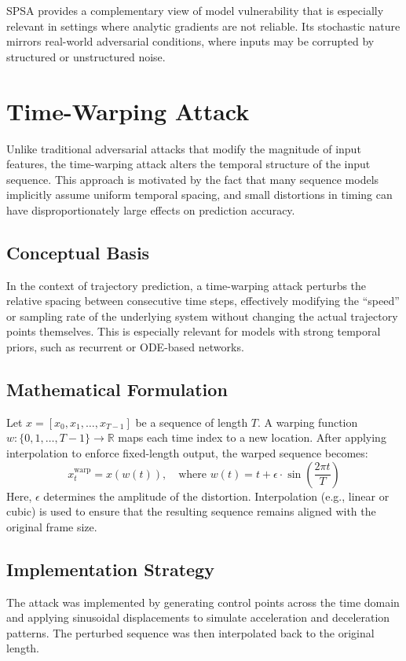 SPSA provides a complementary view of model vulnerability that is especially relevant in settings where analytic gradients are not reliable. Its stochastic nature mirrors real-world adversarial conditions, where inputs may be corrupted by structured or unstructured noise.

\section{Time-Warping Attack}

Unlike traditional adversarial attacks that modify the magnitude of input features, the time-warping attack alters the temporal structure of the input sequence. This approach is motivated by the fact that many sequence models implicitly assume uniform temporal spacing, and small distortions in timing can have disproportionately large effects on prediction accuracy.

\subsection{Conceptual Basis}
In the context of trajectory prediction, a time-warping attack perturbs the relative spacing between consecutive time steps, effectively modifying the “speed” or sampling rate of the underlying system without changing the actual trajectory points themselves. This is especially relevant for models with strong temporal priors, such as recurrent or ODE-based networks.

\subsection{Mathematical Formulation}
Let $x = [x_0, x_1, \dots, x_{T-1}]$ be a sequence of length $T$. A warping function $w: \{0, 1, \dots, T-1\} \to \mathbb{R}$ maps each time index to a new location. After applying interpolation to enforce fixed-length output, the warped sequence becomes:
\[
x^{\text{warp}}_t = x(w(t)), \quad \text{where } w(t) = t + \epsilon \cdot \sin\left( \frac{2\pi t}{T} \right)
\]
Here, $\epsilon$ determines the amplitude of the distortion. Interpolation (e.g., linear or cubic) is used to ensure that the resulting sequence remains aligned with the original frame size.

\subsection{Implementation Strategy}
The attack was implemented by generating control points across the time domain and applying sinusoidal displacements to simulate acceleration and deceleration patterns. The perturbed sequence was then interpolated back to the original length.

